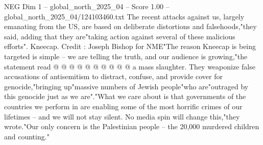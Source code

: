 \begin{textsample}{NEG Dim 1 – global\_north\_2025\_04 – Score 1.00 – global\_north\_2025\_04/124103460.txt}
The recent attacks against us, largely emanating from the US, are based on deliberate distortions and falsehoods,"they said, adding that they are"taking action against several of these malicious efforts".
Kneecap.
Credit : Joseph Bishop for NME"The reason Kneecap is being targeted is simple -- we are telling the truth, and our audience is growing,"the statement read @ @ @ @ @ @ @ @ @ @ a mass slaughter.
They weaponize false accusations of antisemitism to distract, confuse, and provide cover for genocide,"bringing up"massive numbers of Jewish people"who are"outraged by this genocide just as we are"."What we care about is that governments of the countries we perform in are enabling some of the most horrific crimes of our lifetimes -- and we will not stay silent.
No media spin will change this,"they wrote."Our only concern is the Palestinian people -- the 20,000 murdered children and counting."

\end{textsample}
